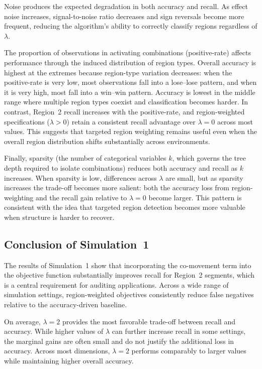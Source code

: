 \documentclass[11pt,letterpaper,english]{article}
\theoremstyle{definition}
\theoremstyle{definition}
\begin{document}
\begin{bibunit}
Noise produces the expected degradation in both accuracy and recall. As effect noise increases, signal-to-noise ratio decreases and sign reversals become more frequent, reducing the algorithm’s ability to correctly classify regions regardless of $\lambda$.

The proportion of observations in activating combinations (positive-rate) affects performance through the induced distribution of region types. Overall accuracy is highest at the extremes because region-type variation decreases: when the positive-rate is very low, most observations fall into a lose--lose pattern, and when it is very high, most fall into a win--win pattern. Accuracy is lowest in the middle range where multiple region types coexist and classification becomes harder. In contrast, Region~2 recall increases with the positive-rate, and region-weighted specifications ($\lambda>0$) retain a consistent recall advantage over $\lambda=0$ across most values. This suggests that targeted region weighting remains useful even when the overall region distribution shifts substantially across environments.

Finally, sparsity (the number of categorical variables $k$, which governs the tree depth required to isolate combinations) reduces both accuracy and recall as $k$ increases. When sparsity is low, differences across $\lambda$ are small, but as sparsity increases the trade-off becomes more salient: both the accuracy loss from region-weighting and the recall gain relative to $\lambda=0$ become larger. This pattern is consistent with the idea that targeted region detection becomes more valuable when structure is harder to recover.

\subsection{Conclusion of Simulation~1}

The results of Simulation~1 show that incorporating the co-movement term into the objective function substantially improves recall for Region~2 segments, which is a central requirement for auditing applications. Across a wide range of simulation settings, region-weighted objectives consistently reduce false negatives relative to the accuracy-driven baseline.

On average, $\lambda=2$ provides the most favorable trade-off between recall and accuracy. While higher values of $\lambda$ can further increase recall in some settings, the marginal gains are often small and do not justify the additional loss in accuracy. Across most dimensions, $\lambda=2$ performs comparably to larger values while maintaining higher overall accuracy.


\end{bibunit}
\end{document}

